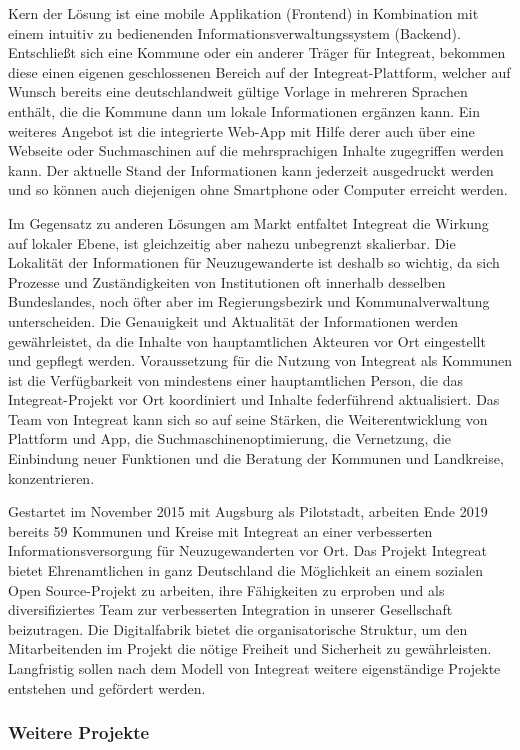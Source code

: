 \documentclass[12pt, a4paper]{article} %
\begin{document}
Kern der Lösung ist eine mobile Applikation (Frontend) in Kombination
mit einem intuitiv zu bedienenden Informationsverwaltungssystem
(Backend). Entschließt sich eine Kommune oder ein anderer Träger für
Integreat, bekommen diese einen eigenen geschlossenen Bereich auf der
Integreat-Plattform, welcher auf Wunsch bereits eine deutschlandweit
gültige Vorlage in mehreren Sprachen enthält, die die Kommune dann um
lokale Informationen ergänzen kann. Ein weiteres Angebot ist die
integrierte Web-App mit Hilfe derer auch über eine Webseite oder
Suchmaschinen auf die mehrsprachigen Inhalte zugegriffen werden kann.
Der aktuelle Stand der Informationen kann jederzeit ausgedruckt werden
und so können auch diejenigen ohne Smartphone oder Computer erreicht
werden.

Im Gegensatz zu anderen Lösungen am Markt entfaltet Integreat die
Wirkung auf lokaler Ebene, ist gleichzeitig aber nahezu unbegrenzt
skalierbar. Die Lokalität der Informationen für Neuzugewanderte ist
deshalb so wichtig, da sich Prozesse und Zuständigkeiten von
Institutionen oft innerhalb desselben Bundeslandes, noch öfter aber im
Regierungsbezirk und Kommunalverwaltung unterscheiden. Die Genauigkeit
und Aktualität der Informationen werden gewährleistet, da die Inhalte
von hauptamtlichen Akteuren vor Ort eingestellt und gepflegt werden.
Voraussetzung für die Nutzung von Integreat als Kommunen ist die
Verfügbarkeit von mindestens einer hauptamtlichen Person, die das
Integreat-Projekt vor Ort koordiniert und Inhalte federführend
aktualisiert. Das Team von Integreat kann sich so auf seine Stärken, die
Weiterentwicklung von Plattform und App, die Suchmaschinenoptimierung,
die Vernetzung, die Einbindung neuer Funktionen und die Beratung der
Kommunen und Landkreise, konzentrieren.

Gestartet im November 2015 mit Augsburg als Pilotstadt, arbeiten Ende
2019 bereits 59 Kommunen und Kreise mit Integreat an einer verbesserten
Informationsversorgung für Neuzugewanderten vor Ort. Das Projekt
Integreat bietet Ehrenamtlichen in ganz Deutschland die Möglichkeit an
einem sozialen Open Source-Projekt zu arbeiten, ihre Fähigkeiten zu
erproben und als diversifiziertes Team zur verbesserten Integration in
unserer Gesellschaft beizutragen. Die Digitalfabrik bietet die
organisatorische Struktur, um den Mitarbeitenden im Projekt die nötige
Freiheit und Sicherheit zu gewährleisten. Langfristig sollen nach dem
Modell von Integreat weitere eigenständige Projekte entstehen und
gefördert werden.

\hypertarget{weitere-projekte}{%
\subsubsection{Weitere Projekte}\label{weitere-projekte}}
\end{document}
